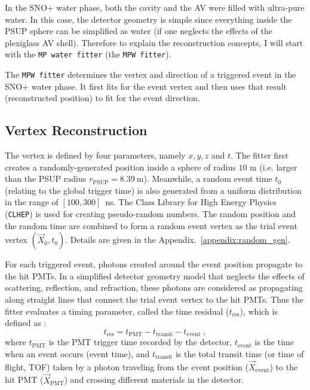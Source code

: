 In the SNO+ water phase, both the cavity and the AV were filled with ultra-pure water. In this case, the detector geometry is simple since everything inside the PSUP sphere can be simplified as water (if one neglects the effects of the plexiglass AV shell). Therefore to explain the reconstruction concepts, I will start with the \texttt{MP water fitter} (the \texttt{MPW fitter}).

The \texttt{MPW fitter} determines the vertex and direction of a triggered event in the SNO+ water phase. It first fits for the event vertex and then uses that result (reconstructed position) to fit for the event direction.

\subsection{Vertex Reconstruction}\label{sect:waterVertex}

The vertex is defined by four parameters, namely $x,y,z$ and $t$. The fitter first creates a randomly-generated position inside a sphere of radius $10$ m (i.e. larger than the PSUP radius $r_{\mathrm{PSUP}}=8.39~$m). Meanwhile, a random event time $t_0$ (relating to the global trigger time) is also generated from a uniform distribution in the range of $[100,300]$~ns. The Class Library for High Energy Physics (\texttt{CLHEP}) is used for creating pseudo-random numbers. The random position and the random time are combined to form a random event vertex as the trial event vertex $(\vec{X}_0,t_0)$. Details are given in the Appendix.~\ref{appendix:random_gen}.

For each triggered event, photons created around the event position propagate to the hit PMTs. In a simplified detector geometry model that neglects the effects of scattering, reflection, and refraction, these photons are considered as propagating along straight lines that connect the trial event vertex to the hit PMTs. Thus the fitter evaluates a timing parameter, called the time residual ($t_\mathrm{res}$), which is defined as \cite{boulay2004direct}:
\begin{equation}
\label{eq:tres_define}
t_\mathrm{res}=t_\mathrm{PMT} - t_{\mathrm{transit}} - t_{\mathrm{event}}\;,
\end{equation}
where $t_\mathrm{PMT}$ is the PMT trigger time recorded by the detector, $t_{\mathrm{event}}$ is the time when an event occurs (event time), and $t_{\mathrm{transit}}$ is the total transit time (or time of flight, TOF) taken by a photon traveling from the event position ($\vec{X}_{\mathrm{event}}$) to the hit PMT ($\vec{X}_{\mathrm{PMT}}$) and crossing different materials in the detector.

